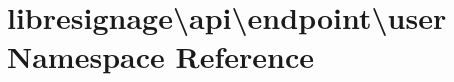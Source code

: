 \hypertarget{namespacelibresignage_1_1api_1_1endpoint_1_1user}{}\section{libresignage\textbackslash{}api\textbackslash{}endpoint\textbackslash{}user Namespace Reference}
\label{namespacelibresignage_1_1api_1_1endpoint_1_1user}
